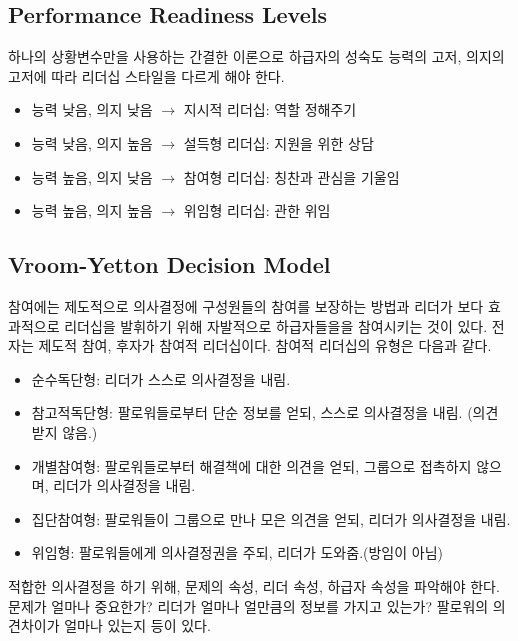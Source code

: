 \subsection*{Performance Readiness Levels}
하나의 상황변수만을 사용하는 간결한 이론으로 하급자의 성숙도 능력의 고저, 의지의
고저에 따라 리더십 스타일을 다르게 해야 한다.
\begin{itemize}
  \item 능력 낮음, 의지 낮음 $\to$ 지시적 리더십: 역할 정해주기
  \item 능력 낮음, 의지 높음 $\to$ 설득형 리더십: 지원을 위한 상담
  \item 능력 높음, 의지 낮음 $\to$ 참여형 리더십: 칭찬과 관심을 기울임
  \item 능력 높음, 의지 높음 $\to$ 위임형 리더십: 관한 위임
\end{itemize}

\subsection*{Vroom-Yetton Decision Model}

참여에는 제도적으로 의사결정에 구성원들의 참여를 보장하는 방법과 리더가 보다
효과적으로 리더십을 발휘하기 위해 자발적으로 하급자들을을 참여시키는 것이 있다.
전자는 제도적 참여, 후자가 참여적 리더십이다. 참여적 리더십의 유형은 다음과 같다.
\begin{itemize}
  \item 순수독단형: 리더가 스스로 의사결정을 내림.
  \item 참고적독단형: 팔로워들로부터 단순 정보를 얻되, 스스로 의사결정을 내림. (의견 받지 않음.)
  \item 개별참여형: 팔로워들로부터 해결책에 대한 의견을 얻되, 그룹으로 접촉하지 않으며, 리더가 의사결정을 내림.
  \item 집단참여형: 팔로워들이 그룹으로 만나 모은 의견을 얻되, 리더가 의사결정을 내림.
  \item 위임형: 팔로워들에게 의사결정권을 주되, 리더가 도와줌.(방임이 아님)
\end{itemize}

적합한 의사결정을 하기 위해, 문제의 속성, 리더 속성, 하급자 속성을 파악해야
한다. 문제가 얼마나 중요한가? 리더가 얼마나 얼만큼의 정보를 가지고 있는가?
팔로워의 의견차이가 얼마나 있는지 등이 있다.

